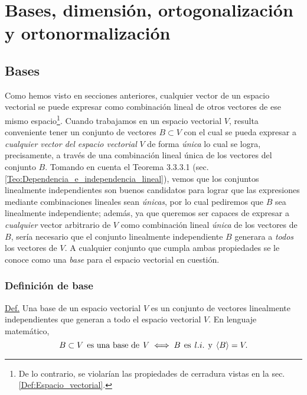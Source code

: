 \documentclass[12pt,dvipsnames]{article}
\begin{document}
\newpage
\section{Bases, dimensión, ortogonalización y ortonormalización} \label{Sec:4}

\subsection{Bases}

Como hemos visto en secciones anteriores, cualquier vector de un espacio vectorial se puede expresar como combinación lineal de otros vectores de ese mismo espacio\footnote{De lo contrario, se violarían las propiedades de cerradura vistas en la sec. \ref{Def:Espacio_vectorial}.}. Cuando trabajamos en un espacio vectorial $V$, resulta conveniente tener un conjunto de vectores $B\subset V$ con el cual se pueda expresar a \emph{cualquier vector del espacio vectorial} $V$ de forma \emph{única} \textemdash lo cual se logra, precisamente, a través de una combinación lineal única de los vectores del conjunto $B$. Tomando en cuenta el Teorema 3.3.3.1 (sec. \ref{Teo:Dependencia_e_independencia_lineal}), vemos que los conjuntos linealmente independientes son buenos candidatos para lograr que las expresiones mediante combinaciones lineales sean \emph{únicas}, por lo cual pediremos que $B$ sea linealmente independiente; además, ya que queremos ser capaces de expresar a \emph{cualquier} vector arbitrario de $V$ como combinación lineal \emph{única} de los vectores de $B$, sería necesario que el conjunto linealmente independiente $B$ generara a \emph{todos} los vectores de $V$. A cualquier conjunto que cumpla ambas propiedades se le conoce como una \emph{base} para el espacio vectorial en cuestión.

\subsubsection{Definición de base} \label{Def:Base}

\begin{tcolorbox}

    \underline{Def.} Una base de un espacio vectorial $V$ es un conjunto de vectores linealmente independientes que generan a todo el espacio vectorial $V$. En lenguaje matemático, $$B\subset V \hspace{1.5mm}\text{es una base de}\hspace{1.5mm} V \iff B\hspace{1.5mm}\text{es}\hspace{1.5mm} l.i.  \hspace{1.5mm}\text{y}\hspace{1.5mm} \langle B \rangle=V.$$

\end{tcolorbox}
\end{document}
